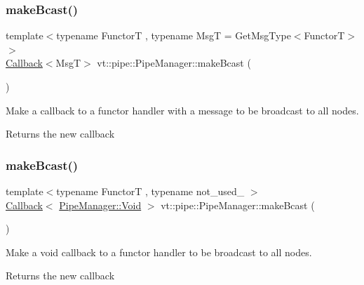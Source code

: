 \subsubsection{\texorpdfstring{make\+Bcast()}{makeBcast()}\hspace{0.1cm}{\footnotesize\ttfamily [2/6]}}
{\footnotesize\ttfamily template$<$typename FunctorT , typename MsgT  = Get\+Msg\+Type$<$\+Functor\+T$>$$>$ \\
\hyperlink{namespacevt_a36db99df4c973d48b1118a293fff533f}{Callback}$<$MsgT$>$ vt\+::pipe\+::\+Pipe\+Manager\+::make\+Bcast (\begin{DoxyParamCaption}{ }\end{DoxyParamCaption})}



Make a callback to a functor handler with a message to be broadcast to all nodes. 

\begin{DoxyReturn}{Returns}
the new callback 
\end{DoxyReturn}
\mbox{\label{structvt_1_1pipe_1_1_pipe_manager_a42e6860c842d31411b7d90154a0c6a17}} 
\subsubsection{\texorpdfstring{make\+Bcast()}{makeBcast()}\hspace{0.1cm}{\footnotesize\ttfamily [3/6]}}
{\footnotesize\ttfamily template$<$typename FunctorT , typename not\+\_\+used\+\_\+ $>$ \\
\hyperlink{namespacevt_a36db99df4c973d48b1118a293fff533f}{Callback}$<$ \hyperlink{structvt_1_1pipe_1_1_pipe_manager_ab720c2580ecfd3ab36e49aeaaff64cc6}{Pipe\+Manager\+::\+Void} $>$ vt\+::pipe\+::\+Pipe\+Manager\+::make\+Bcast (\begin{DoxyParamCaption}{ }\end{DoxyParamCaption})}



Make a void callback to a functor handler to be broadcast to all nodes. 

\begin{DoxyReturn}{Returns}
the new callback 
\end{DoxyReturn}
\mbox{\label{structvt_1_1pipe_1_1_pipe_manager_a1fefc503b58bbdf791e76a6c8f339df6}} 
